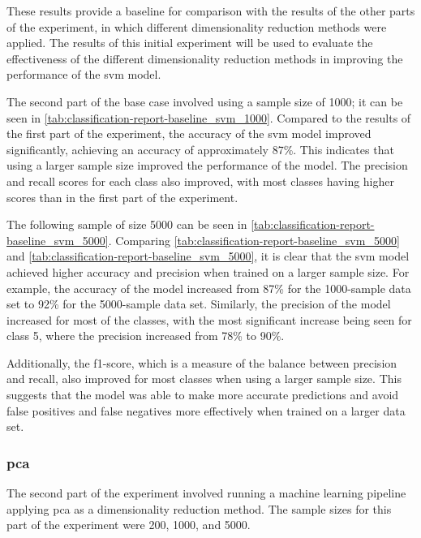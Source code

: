 These results provide a baseline for comparison with the results of the other parts of the experiment, in which different dimensionality reduction methods were applied. The results of this initial experiment will be used to evaluate the effectiveness of the different dimensionality reduction methods in improving the performance of the \gls{svm} model.

The second part of the base case involved using a sample size of 1000; it can be seen in \ref{tab:classification-report-baseline_svm_1000}. Compared to the results of the first part of the experiment, the accuracy of the \gls{svm} model improved significantly, achieving an accuracy of approximately 87\%. This indicates that using a larger sample size improved the performance of the model. The precision and recall scores for each class also improved, with most classes having higher scores than in the first part of the experiment.

The following sample of size 5000 can be seen in \ref{tab:classification-report-baseline_svm_5000}.
Comparing \ref{tab:classification-report-baseline_svm_5000} and \ref{tab:classification-report-baseline_svm_5000}, it is clear that the \gls{svm} model achieved higher accuracy and precision when trained on a larger sample size. For example, the accuracy of the model increased from 87\% for the 1000-sample data set to 92\% for the 5000-sample data set. Similarly, the precision of the model increased for most of the classes, with the most significant increase being seen for class 5, where the precision increased from 78\% to 90\%.

Additionally, the f1-score, which is a measure of the balance between precision and recall, also improved for most classes when using a larger sample size. This suggests that the model was able to make more accurate predictions and avoid false positives and false negatives more effectively when trained on a larger data set.


\subsubsection{\gls{pca}}\label{subsubsec:experiment_4_pca}

The second part of the experiment involved running a machine learning pipeline applying \gls{pca} as a dimensionality reduction method. The sample sizes for this part of the experiment were 200, 1000, and 5000.



